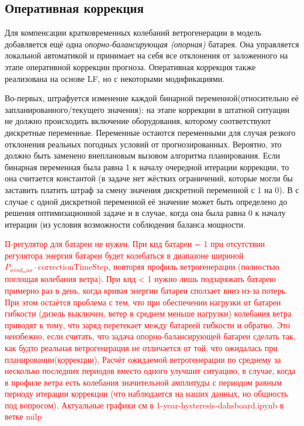 \documentclass{report}
\begin{document}
    \subsection{Оперативная коррекция}
        Для компенсации кратковременных колебаний ветрогенерации в модель добавляется ещё одна \textit{опорно-балансирующая (опорная)} батарея.
        Она управляется локальной автоматикой и принимает на себя все отклонения от заложенного на этапе оперативной коррекции прогноза.
        Оперативная коррекция также реализована на основе LF, но с некоторыми модификациями.
        
        Во-первых, штрафуется изменение каждой бинарной переменной(относительно её запланированного/текущего значения): 
        на этапе коррекции в штатной ситуации не должно происходить включение оборудования, которому соответствуют дискретные переменные.
        Переменные остаются переменными для случая резкого отклонения реальных погодных условий от прогнозированных. 
        Вероятно, это должно быть заменено внеплановым вызовом алгоритма планирования.
        Если бинарная переменная была равна 1 к началу очередной итерации коррекции, то она считается константой (в задаче нет жёстких ограничений, которые могли бы заставить платить штраф за смену значения дискретной переменной с 1 на 0).
        В с случае с одной дискретной переменной её значение может быть определено до решения оптимизационной задаче и в случае, когда она была равна 0 к началу итерации (из условия возможности соблюдения баланса мощности.
        
        
        \textcolor{red}{П-регулятор для батареи не нужен. 
        При кпд батареи = 1 при отсутствии регулятора энергия батареи будет колебаться в диапазоне шириной $P_{wind_max} \cdot \text{correctionTimeStep}$, повторяя профиль ветрогенерации (полностью поглощая колебания ветра). При кпд < 1 нужно лишь подзаряжать батарею примерно раз в день, когда кривая энергии батареи сползает вниз из-за потерь.
        При этом остаётся проблема с тем, что при обеспечении нагрузки от батареи гибкости (дизель выключен, ветер в среднем меньше нагрузки) колебания ветра приводят к тому, что заряд перетекает между батареей гибкости и обратно.
        Это неизбежно, если считать, что задача опорно-балансирующей батареи сделать так, как будто реальная ветрогенерация не отличается от той, что ожидалась при планировании(коррекции). 
        Расчёт ожидаемой ветрогенерации по среднему за несколько последних периодов вместо одного улучшит ситуацию, в случае, когда в профиле ветра есть колебания значительной амплитуды с периодом равным периоду итерации коррекции (что наблюдается на наших данных, но общность под вопросом). Актуальные графики см в 1-year-hysteresis-dahsboard.ipynb в ветке milp}
        
\end{document}

